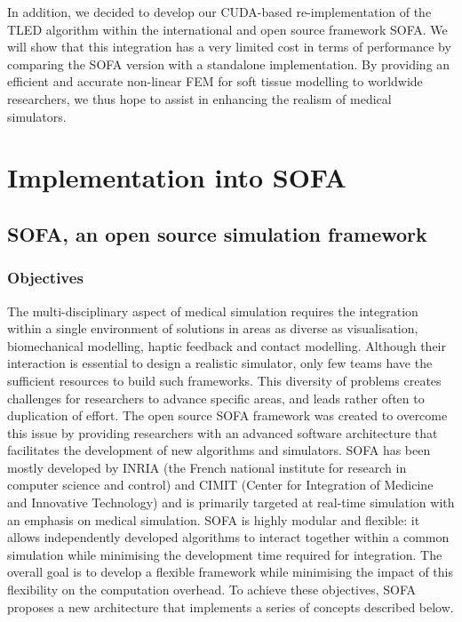 In addition, we decided to develop our CUDA-based re-implementation of the TLED algorithm within the international and open source framework SOFA. We will show that this integration has a very limited cost in terms of performance by comparing the SOFA version with a standalone implementation. By providing an efficient and accurate non-linear FEM for soft tissue modelling to worldwide researchers, we thus hope to assist in enhancing the realism of medical simulators.
	
	
\section{Implementation into SOFA}

	\subsection{SOFA, an open source simulation framework}	\label{chap6:SOFA}

\subsubsection*{Objectives}
The multi-disciplinary aspect of medical simulation requires the integration within a single environment of solutions in areas as diverse as visualisation, biomechanical modelling, haptic feedback and contact modelling. Although their interaction is essential to design a realistic simulator, only few teams have the sufficient resources to build such frameworks. This diversity of problems creates challenges for researchers to advance specific areas, and leads rather often to duplication of effort. The open source SOFA framework \citep{Allard07} was created to overcome this issue by providing researchers with an advanced software architecture that facilitates the development of new algorithms and simulators. SOFA has been mostly developed by INRIA (the French national institute for research in computer science and control) and CIMIT (Center for Integration of Medicine and Innovative Technology) and is primarily targeted at real-time simulation with an emphasis on medical simulation. SOFA is highly modular and flexible: it allows independently developed algorithms to interact together within a common simulation while minimising the development time required for integration. The overall goal is to develop a flexible framework while minimising the impact of this flexibility on the computation overhead. To achieve these objectives, SOFA proposes a new architecture that implements a series of concepts described below. 

